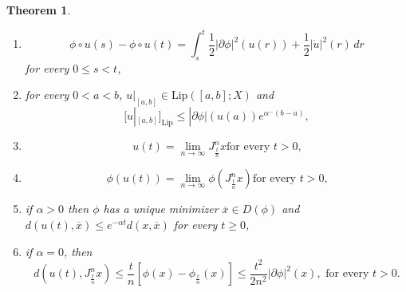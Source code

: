 \documentclass[a4paper,11pt, leqno]{scrreprt} %
\renewcommand{\leq}{\leqslant}
\renewcommand{\leq}{\leqslant}
\renewcommand{\geq}{\geqslant}
\theoremstyle{change}
\newcounter{acounter}[chapter]
\newtheorem{theorem}[acounter]{Theorem}
\theoremstyle{nonumberplain}
\begin{document}
\begin{theorem}
\begin{enumerate}
      $u$ at $t$,
      \item \label{item:ms_thm_2_7}
        \begin{equation}
          \label{eq:ms_thm_2_4}
          \phi \circ u(s) - \phi \circ u(t) = \int_s^t \frac12
          |\partial \phi|^2(u(r)) + \frac12 |\dot u|^2(r) \, dr
        \end{equation}
        for every $0 \leq s < t$,
      \item \label{item:ms_thm_2_8} for every $0 < a < b$, $u|_{[a,b]}
        \in \text{Lip}([a, b]; X)$ and
        \begin{equation}
          \label{eq:ms_thm_2_5}
          [u|_{[a,b]}]_{\text{Lip}} \leq |\partial \phi|(u(a))
          e^{\alpha^- (b - a)},
        \end{equation}
      \item \label{item:ms_thm_2_9}
        \begin{equation}
          \label{eq:ms_thm_2_6}
          u(t) = \lim_{n \to \infty} J_\frac{t}{n}^n x \text{
            for every $t > 0$,}
        \end{equation}
      \item \label{item:ms_thm_2_10}
        \begin{equation}
          \label{eq:ms_thm_2_7}
          \phi(u(t)) = \lim_{n \to \infty} \phi(J_\frac{t}{n}^n x) \text{
            for every $t > 0$,}
        \end{equation}
      \item \label{item:ms_thm_2_11} if $\alpha > 0$ then $\phi$ has a
        unique minimizer $\overline x \in D(\phi)$ and $d(u(t),
        \overline x) \leq e^{-\alpha t} d(x, \overline x)$ for every
        $t \geq 0$,
      \item \label{item:ms_thm_2_12} if $\alpha = 0$, then
        \begin{equation}
          \label{eq:ms_thm_2_13}
          d \left (u(t), J_\frac{t}{n}^n x \right ) \leq \frac{t}{n}
          \left [\phi(x) - \phi_\frac{t}{n}(x) \right ] \leq
          \frac{t^2}{2n^2} |\partial \phi|^2(x), \text{ for every $t > 0$.}
        \end{equation}
  \end{enumerate}
\end{theorem}
\end{document}
